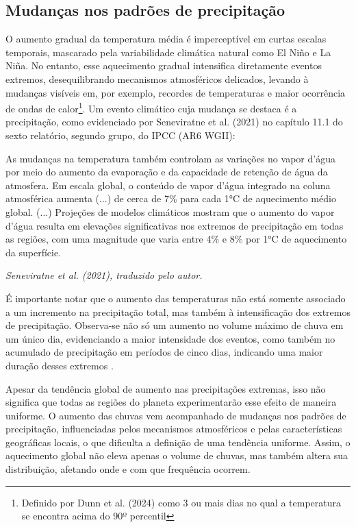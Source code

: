 \subsection{Mudanças nos padrões de precipitação}
\label{rain}
O aumento gradual da temperatura média é imperceptível em curtas escalas temporais, mascarado pela variabilidade
climática natural como El Niño e La Niña. No entanto, esse aquecimento gradual intensifica diretamente eventos extremos,
desequilibrando mecanismos atmosféricos delicados, levando à mudanças visíveis em, por exemplo, recordes de temperaturas
e maior ocorrência de ondas de calor\footnote{Definido por Dunn et al. (2024) \cite{dunn} como 3 ou mais dias no qual a
temperatura se encontra acima do 90º percentil}. Um evento climático cuja mudança se destaca é a precipitação, como
evidenciado por Seneviratne et al. (2021) no capítulo 11.1 do sexto relatório, segundo grupo, do IPCC (AR6 WGII): 

\begin{citacao}
As mudanças na temperatura também controlam as variações no vapor d'água por meio do aumento da evaporação e da
capacidade de retenção de água da atmosfera. Em escala global, o conteúdo de vapor d'água integrado na coluna
atmosférica aumenta (...) de cerca de 7\% para cada 1°C de aquecimento médio global. (...) Projeções de modelos
climáticos mostram que o aumento do vapor d'água resulta em elevações significativas nos extremos de precipitação em
todas as regiões, com uma magnitude que varia entre 4\% e 8\% por 1°C de aquecimento da superfície.

\textit{Seneviratne et al. (2021)\cite{ipcc_ar6_wg2_chap11}, traduzido pelo autor.}

\end{citacao}

É importante notar que o aumento das temperaturas não está somente associado a um incremento na precipitação total, mas
também à intensificação dos extremos de precipitação. Observa-se não só um aumento no volume máximo de chuva em um único
dia, evidenciando a maior intensidade dos eventos, como também no acumulado de precipitação em períodos de cinco dias,
indicando uma maior duração desses extremos \cite{dunn}.

Apesar da tendência global de aumento nas precipitações extremas, isso não significa que todas as regiões do planeta
experimentarão esse efeito de maneira uniforme. O aumento das chuvas vem acompanhado de mudanças nos padrões de
precipitação, influenciadas pelos mecanismos atmosféricos e pelas características geográficas locais, o que dificulta a
definição de uma tendência uniforme. Assim, o aquecimento global não eleva apenas o volume de chuvas, mas também altera
sua distribuição, afetando onde e com que frequência ocorrem.

